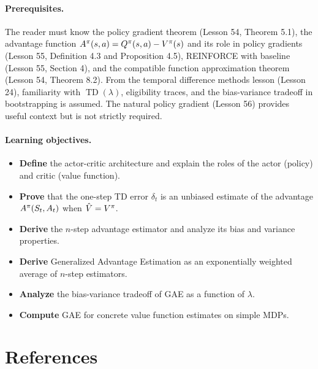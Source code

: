 \documentclass[11pt,a4paper]{article}
\begin{document}
\paragraph{Prerequisites.}
The reader must know the policy gradient theorem (Lesson 54, Theorem 5.1),
the advantage function $A^\pi(s,a) = Q^{\pi}(s,a) - V^{\pi}(s)$ and its
role in policy gradients (Lesson 55, Definition 4.3 and Proposition 4.5),
REINFORCE with baseline (Lesson 55, Section 4), and the compatible
function approximation theorem (Lesson 54, Theorem 8.2). From the
temporal difference methods lesson (Lesson 24), familiarity with
$\operatorname{TD}(\lambda)$, eligibility traces, and the bias-variance
tradeoff in bootstrapping is assumed. The natural policy gradient
(Lesson 56) provides useful context but is not strictly required.

\paragraph{Learning objectives.}
\begin{itemize}
  \item \textbf{Define} the actor-critic architecture and explain the
    roles of the actor (policy) and critic (value function).
  \item \textbf{Prove} that the one-step TD error $\delta_t$ is an
    unbiased estimate of the advantage $A^\pi(S_t, A_t)$
    when $\hat{V} = V^{\pi}$.
  \item \textbf{Derive} the $n$-step advantage estimator and analyze
    its bias and variance properties.
  \item \textbf{Derive} Generalized Advantage Estimation as an
    exponentially weighted average of $n$-step estimators.
  \item \textbf{Analyze} the bias-variance tradeoff of GAE as a
    function of $\lambda$.
  \item \textbf{Compute} GAE for concrete value function estimates
    on simple MDPs.
\end{itemize}

\section{References}
\end{document}
